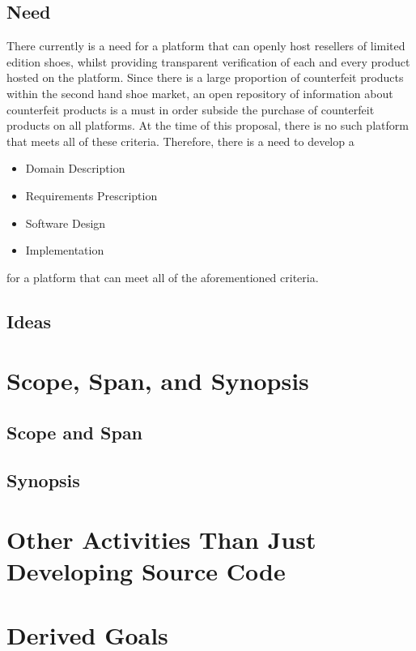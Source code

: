 \subsection{Need}
\hspace{1cm} There currently is a need for a platform that can openly host resellers of limited edition shoes, whilst providing transparent verification of each and every product hosted on the platform. Since there is a large proportion of counterfeit products within the second hand shoe market, an open repository of information about counterfeit products is a must in order subside the purchase of counterfeit products on all platforms. At the time of this proposal, there is no such platform that meets all of these criteria. Therefore, there is a need to develop a
\begin{itemize}
  \item Domain Description
  \item Requirements Prescription
  \item Software Design
  \item Implementation
\end{itemize}
for a platform that can meet all of the aforementioned criteria.
\subsection{Ideas}
\section{Scope, Span, and Synopsis}
\subsection{Scope and Span}
\subsection{Synopsis}
\section{Other Activities Than Just Developing Source Code}
\section{Derived Goals}
